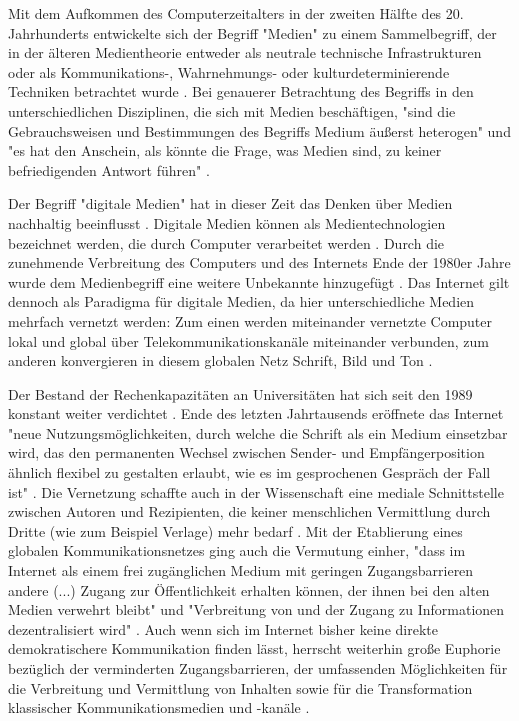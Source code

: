 Mit dem Aufkommen des Computerzeitalters in der zweiten Hälfte des 20. Jahrhunderts entwickelte sich der Begriff "Medien" zu einem Sammelbegriff, der in der älteren Medientheorie entweder als neutrale technische Infrastrukturen oder als Kommunikations-, Wahrnehmungs- oder kulturdeterminierende Techniken betrachtet wurde \cite[:12]{Beck_2005}. Bei genauerer Betrachtung des Begriffs in den unterschiedlichen Disziplinen, die sich mit Medien beschäftigen, "sind die Gebrauchsweisen und Bestimmungen des Begriffs Medium äußerst heterogen" und "es hat den Anschein, als könnte die Frage, was Medien sind, zu keiner befriedigenden Antwort führen" \cite[:33]{Burkhardt_2015}.

Der Begriff "digitale Medien" hat in dieser Zeit das Denken über Medien nachhaltig beeinflusst  \cite[:30]{Burkhardt_2015}. Digitale Medien können als Medientechnologien bezeichnet werden, die durch Computer verarbeitet werden \cite{Nuenning_2013}. Durch die zunehmende Verbreitung des Computers und des Internets Ende der 1980er Jahre wurde dem Medienbegriff eine weitere Unbekannte hinzugefügt \cite{Burkhardt_2015}. Das Internet gilt dennoch als Paradigma für digitale Medien, da hier unterschiedliche Medien mehrfach vernetzt werden: Zum einen werden miteinander vernetzte Computer lokal und global über Telekommunikationskanäle miteinander verbunden, zum anderen konvergieren in diesem globalen Netz Schrift, Bild und Ton \cite{Nuenning_2013}.

Der Bestand der Rechenkapazitäten an Universitäten hat sich seit den 1989 konstant weiter verdichtet \cite{Rutenfranz_1997}. Ende des letzten Jahrtausends eröffnete das Internet "neue Nutzungsmöglichkeiten, durch welche die Schrift als ein Medium einsetzbar wird, das den permanenten Wechsel zwischen Sender- und Empfängerposition ähnlich flexibel zu gestalten erlaubt, wie es im gesprochenen Gespräch der Fall ist" \cite{Sandbothe_2000}. Die Vernetzung schaffte auch in der Wissenschaft eine mediale Schnittstelle zwischen Autoren und Rezipienten, die keiner menschlichen Vermittlung durch Dritte (wie zum Beispiel Verlage) mehr bedarf \cite{Naeder_2010}. Mit der Etablierung eines globalen Kommunikationsnetzes ging auch die Vermutung einher, "dass im Internet als einem frei zugänglichen Medium mit geringen Zugangsbarrieren andere (...) Zugang zur Öffentlichkeit erhalten können, der ihnen bei den alten Medien verwehrt bleibt" und "Verbreitung von und der Zugang zu Informationen dezentralisiert wird" \cite{Gerhards_2007}. Auch wenn sich im Internet bisher keine direkte demokratischere Kommunikation finden lässt, herrscht weiterhin große Euphorie bezüglich der verminderten Zugangsbarrieren, der umfassenden Möglichkeiten für die Verbreitung und Vermittlung von Inhalten sowie für die Transformation klassischer Kommunikationsmedien und -kanäle  \cite{Gerhards_2007}.

